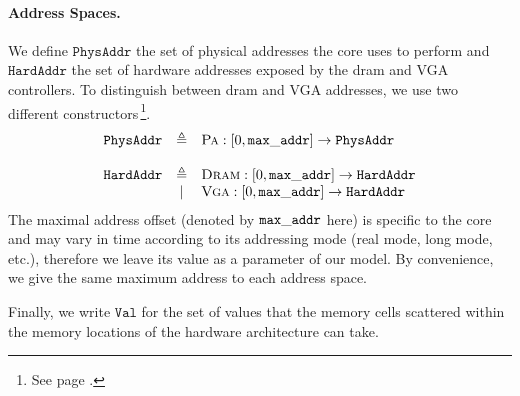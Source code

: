 \paragraph{Address Spaces.}
%
We define $\texttt{PhysAddr}$ the set of physical addresses the core uses to
perform \IO and $\texttt{HardAddr}$ the set of hardware addresses exposed by the
\ac{dram} and VGA controllers.
%
To distinguish between \ac{dram} and VGA addresses, we use two different
constructors\,\footnote{See page \pageref{frontmatter:notations}.}.
%
\[
  \begin{array}{rcl}
    \texttt{PhysAddr}
    & \triangleq
    & \textsc{Pa} : [0, \val{max\_addr}] \rightarrow
      \texttt{PhysAddr} \\
    & %
    & \\ %
    \texttt{HardAddr}
    & \triangleq
    & \textsc{Dram} : [0, \val{max\_addr}] \rightarrow
      \texttt{HardAddr} \\
    & |
    & \textsc{Vga} : [0, \val{max\_addr}] \rightarrow
      \texttt{HardAddr}
  \end{array}
\]
%
The maximal address offset (denoted by $\mathtt{max\_addr}$ here) is specific to
the core and may vary in time according to its addressing mode (real mode, long
mode, etc.), therefore we leave its value as a parameter of our model.
%
By convenience, we give the same maximum address to each address space.

Finally, we write $\texttt{Val}$ for the set of values that the memory cells
scattered within the memory locations of the hardware architecture can take.

